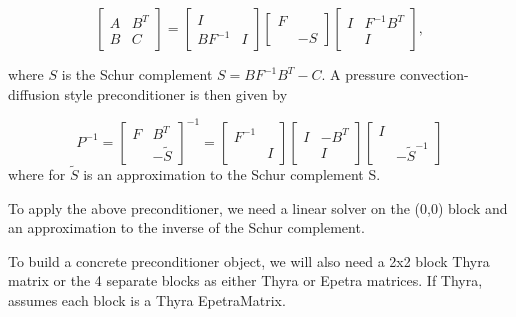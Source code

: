 \documentclass[oneeqnum,onefignum,onetabnum,10pt]{SANDreport}
\begin{document}
\begin{equation}
  \left[ \begin{array}{cc} A & B^T \\ B & C \end{array} \right]
     = \left[ \begin{array}{cc} I & \\ BF^{-1} & I \end{array} \right]
       \left[ \begin{array}{cc} F & \\  & -S \end{array} \right]
       \left[ \begin{array}{cc} I & F^{-1} B^T  \\  & I \end{array} \right],
\end{equation}

where $S$ is the Schur complement $S = B F^{-1} B^T - C$.  A
pressure convection-diffusion style preconditioner is then given by

\begin{equation}
  P^{-1} =
       \left[ \begin{array}{cc} F & B^T \\ & -\tilde S \end{array} \right]^{-1}
       = 
       \left[ \begin{array}{cc} F^{-1} &  \\  & I \end{array} \right]
       \left[ \begin{array}{cc} I & -B^T \\  & I \end{array} \right]
       \left[ \begin{array}{cc} I &  \\  & -\tilde S^{-1} \end{array} \right]
\end{equation}
where for $\tilde S$ is an approximation to the Schur complement S.

To apply the above preconditioner, we need a linear solver on the
(0,0) block and an approximation to the inverse of the Schur
complement.

To build a concrete preconditioner object, we will also need a 2x2
block Thyra matrix or the 4 separate blocks as either Thyra or Epetra
matrices.  If Thyra, assumes each block is a Thyra EpetraMatrix.
\end{document}
